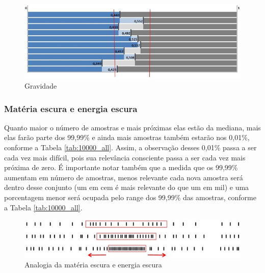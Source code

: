 \begin{figure}[H]
\caption{Gravidade}
\label{fig:consciousness_gravity}
\centering
\includegraphics[scale=.8]{sections/images/consciousness_gravity.jpg}
\end{figure}

\subsubsection{Matéria escura e energia escura}
Quanto maior o número de amostras e mais próximas elas estão da mediana, mais elas farão parte dos 99,99\% e ainda mais amostras também estarão nos 0,01\%, conforme a Tabela \ref{tab:10000_all}. Assim, a observação desses 0,01\% passa a ser cada vez mais difícil, pois sua relevância consciente passa a ser cada vez mais próxima de zero. É importante notar também que a medida que os 99,99\% aumentam em número de amostras, menos relevante cada nova amostra será dentro desse conjunto (um em cem é mais relevante do que um em mil) e uma porcentagem menor será ocupada pelo range dos 99,99\% das amostras, conforme a Tabela \ref{tab:10000_all}.

\begin{figure}[H]
\caption{Analogia da matéria escura e energia escura}
\label{fig:consciousness_dark_matter_dark_energy}
\centering
\includegraphics[scale=1]{sections/images/consciousness_dark_matter_dark_energy.jpg}
\end{figure}


